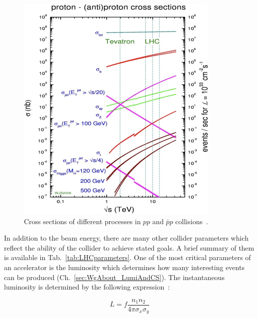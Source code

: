 \begin{figure}
  \centering
  \includegraphics[width=.65\linewidth]{../figs/Exp/LHC_totalCS.png}
  \caption{Cross sections of different processes in $pp$ and $\bar{p}p$ collisions~\cite{ref_fig_LHC_totalCS}.}
  \label{fig:LHC_totalCS}
\end{figure}



In addition to the beam energy, there are many other collider parameters which reflect the ability of the collider to achieve stated goals. A brief summary of them is available in Tab.~\ref{tab:LHCparameters}. One of the most critical parameters of an accelerator is the luminosity which determines how many interesting events can be produced (Ch.~\ref{sec:WgAbout_LumiAndCS}). The instantaneous luminosity is determined by the following expression~\cite{ref_PDG}:

\begin{equation}
L = f \frac{n_1 n_2}{4 \pi \sigma_x \sigma_y}
\end{equation}

